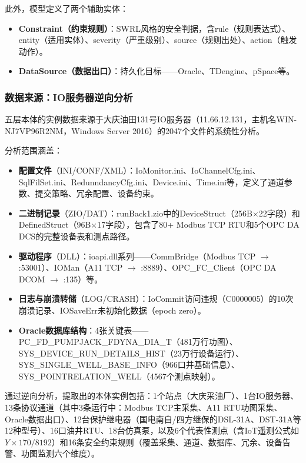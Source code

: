 \documentclass[12pt,a4paper]{article}
\begin{document}
此外，模型定义了两个辅助实体：
\begin{itemize}
  \item \textbf{Constraint（约束规则）}：SWRL风格的安全判据，含rule（规则表达式）、entity（适用实体）、severity（严重级别）、source（规则出处）、action（触发动作）。
  \item \textbf{DataSource（数据出口）}：持久化目标——Oracle、TDengine、pSpace等。
\end{itemize}

\subsubsection{数据来源：IO服务器逆向分析}

五层本体的实例数据来源于大庆油田131号IO服务器（11.66.12.131，主机名WIN-NJ7VP96R2NM，Windows Server 2016）的2047个文件的系统性分析。

分析范围涵盖：
\begin{itemize}
  \item \textbf{配置文件}（INI/CONF/XML）：IoMonitor.ini、IoChannelCfg.ini、SqlFilSet.ini、RedunndancyCfg.ini、Device.ini、Time.ini等，定义了通道参数、提交策略、冗余配置、设备约束。
  \item \textbf{二进制记录}（ZIO/DAT）：runBack1.zio中的DeviceStruct（256B$\times$22字段）和DefinedStruct（96B$\times$17字段），包含了80+ Modbus TCP RTU和5个OPC DA DCS的完整设备表和测点路径。
  \item \textbf{驱动程序}（DLL）：ioapi.dll系列——CommBridge（Modbus TCP $\to$ :53001）、IOMan（A11 TCP $\to$ :8889）、OPC\_FC\_Client（OPC DA DCOM $\to$ :135）等。
  \item \textbf{日志与崩溃转储}（LOG/CRASH）：IoCommit访问违规（C0000005）的10次崩溃记录、IOSaveErr未初始化数据（epoch zero）。
  \item \textbf{Oracle数据库结构}：4张关键表——PC\_FD\_PUMPJACK\_FDYNA\_DIA\_T（481万行功图）、SYS\_DEVICE\_RUN\_DETAILS\_HIST（23万行设备运行）、SYS\_SINGLE\_WELL\_BASE\_INFO（966口井基础信息）、SYS\_POINTRELATION\_WELL（4567个测点映射）。
\end{itemize}

通过逆向分析，提取出的本体实例包括：1个站点（大庆采油厂）、1台IO服务器、13条协议通道（其中3条运行中：Modbus TCP主采集、A11 RTU功图采集、Oracle数据出口）、12台保护继电器（国电南自/四方继保的DSL-31A、DST-31A等12种型号）、16口油井RTU、18台仿真泵，以及6个代表性测点（含IoT遥测公式如$Y\times 170/8192$）和16条安全约束规则（覆盖采集、通道、数据库、冗余、设备告警、功图监测六个维度）。
\end{document}
